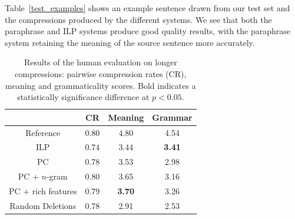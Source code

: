 \documentclass[11pt]{article}
\begin{document}
Table~\ref{test_examples} shows an example sentence drawn from our
test set and the compressions produced by the different systems. We
see that both the paraphrase and ILP systems produce good quality
results, with the paraphrase system retaining the meaning of the
source sentence more accurately.

 \begin{table}
   \small
   \begin{center}
     \begin{tabular}{|c|c|c|c|}
       \hline
       & CR & Meaning & Grammar \\
       \hline
       Reference & 0.80 &  4.80 & 4.54 \\
       \hline
       ILP & 0.74 & 3.44 & {\bf 3.41} \\
       \hline
       \hline
       PC & 0.78 & 3.53 & 2.98 \\
       \hline
       PC + $n$-gram & 0.80 & 3.65 & 3.16 \\
       PC  + rich features & 0.79 & {\bf 3.70} & 3.26 \\
       \hline
       \hline
       Random Deletions & 0.78 & 2.91 & 2.53 \\
       \hline
     \end{tabular}
   \end{center}
   \normalsize
   \caption{Results of the human evaluation on longer compressions:
     pairwise compression rates (CR), meaning and grammaticality scores. 
     Bold indicates a statistically significance difference at $p <
     0.05$.}
   \label{human_judgments}
 \end{table}
\end{document}
